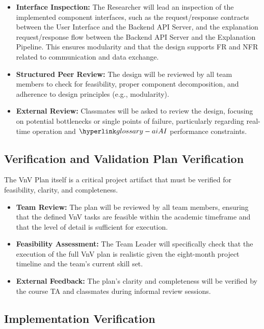 \documentclass[12pt, titlepage]{article}
\begin{document}
\begin{itemize}

\item \textbf{Interface Inspection:} The Researcher will lead an inspection of
the implemented component interfaces, such as the request/response contracts
between the User Interface and the Backend API Server, and the explanation
request/response flow between the Backend API Server and the Explanation Pipeline.
This ensures modularity and that the design supports FR and NFR related to
communication and data exchange.

    \item \textbf{Structured Peer Review:} The design will be reviewed by all team members to check for feasibility, proper component decomposition, and adherence to design principles (e.g., modularity).
    \item \textbf{External Review:} Classmates will be asked to review the design, focusing on potential bottlenecks or single points of failure, particularly regarding real-time operation and $\AI{}$ performance constraints.
\end{itemize}


\subsection{Verification and Validation Plan Verification}



The VnV Plan itself is a critical project artifact that must be verified for feasibility, clarity, and completeness.

\begin{itemize}
    \item \textbf{Team Review:} The plan will be reviewed by all team members, ensuring that the defined VnV tasks are feasible within the academic timeframe and that the level of detail is sufficient for execution.
    \item \textbf{Feasibility Assessment:} The Team Leader will specifically check that the execution of the full VnV plan is realistic given the eight-month project timeline and the team’s current skill set.
    \item \textbf{External Feedback:} The plan's clarity and completeness will be verified by the course TA and classmates during informal review sessions.
\end{itemize}


\subsection{Implementation Verification}
\end{document}
